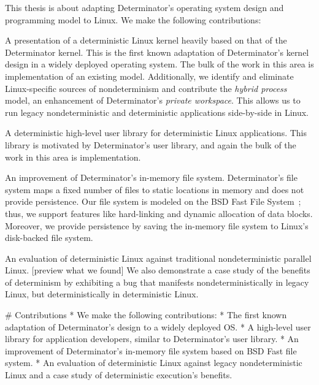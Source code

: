This thesis is about adapting Determinator's operating system design and
programming model to Linux. We make the following contributions:
\begin{myitemize4}
    \item A presentation of a deterministic Linux kernel heavily based on that
    of the Determinator kernel. This is the first known adaptation of
    Determinator's kernel design in a widely deployed operating system.
    The bulk of the work in this area is implementation of an existing model.
    Additionally, we identify and eliminate Linux-specific sources of
    nondeterminism and contribute the \emph{hybrid process} model, an
    enhancement of Determinator's \emph{private workspace}. This allows
    us to run legacy nondeterministic and deterministic applications
    side-by-side in Linux.
    \item A deterministic high-level user library for deterministic Linux
    applications. This library is motivated by Determinator's user library, and
    again the bulk of the work in this area is implementation.
    \item An improvement of Determinator's in-memory file system.
    Determinator's file system maps a fixed number of files to static locations
    in memory and does not provide persistence. Our file system is modeled on
    the BSD Fast File System~\cite{mckusick1984fast}; thus, we support features
    like hard-linking and dynamic allocation of data blocks. Moreover, we
    provide persistence by saving the in-memory file system to Linux's
    disk-backed file system.
    \item An evaluation of deterministic Linux against traditional
    nondeterministic parallel Linux. [preview what we found] We also demonstrate
    a case study of the benefits of determinism by exhibiting a bug that
    manifests nondeterministically in legacy Linux, but deterministically in
    deterministic Linux.
\end{myitemize4}

\iffalse

# Contributions
* We make the following contributions:
* The first known adaptation of Determinator's design to a widely deployed OS.
* A high-level user library for application developers, similar to
  Determinator's user library.
* An improvement of Determinator's in-memory file system based on BSD Fast
  file system.
* An evaluation of deterministic Linux against legacy nondeterministic Linux and
  a case study of deterministic execution's benefits.

